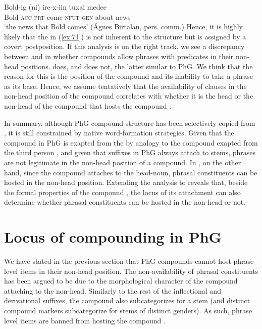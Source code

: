 \documentclass[output=paper]{LSP/langsci}
\begin{document}
\ea\label{ex:72}
	\gll  \lb{} Bold-ig (ni) ire-x\rb{}-iin tuxai medee\\
		{} Bold-\textsc{acc} \textsc{prt} come-\textsc{nfut-gen} about news\\
	\glt  `the news that Bold comes' \hfill (\'{A}gnes Birtalan, pers. comm.)
\z
Hence, it is highly likely that the  in (\ref{ex:71}) is not inherent to the structure but is assigned by a covert postposition. If this analysis is on the right track, we see a discrepancy between  and  in whether compounds allow phrases with predicates in their non-head positions.  does, and  does not, the latter similar to PhG. We think that the reason for this is the position of the compound  and its inability to take a phrase as its base. Hence, we assume tentatively that the availability of clauses in the non-head position of the compound correlates with whether it is the head or the non-head of the compound that hosts the compound . 

In summary, although PhG compound structure has been selectively copied from , it is still constrained by  native word-formation strategies. Given that the compound  in PhG is exapted from the   by analogy to the  compound  exapted from the third person  , and given that suffixes in PhG always attach to stems, phrases are not legitimate in the non-head position of a compound. In , on the other hand, since the compound  attaches to the head-noun, phrasal constituents can be hosted in the non-head position. Extending the  analysis to  reveals that, beside the formal properties of the compound , the locus of its attachment can also determine whether phrasal constituents can be hosted in the non-head or not.  
\section{Locus of compounding in PhG}
We have stated in the previous section that PhG compounds cannot host phrase-level items in their non-head position. The non-availability of phrasal con\-stit\-u\-ents has been argued to be due to the morphological character of the compound  attaching to the non-head. Similarly to the rest of the inflectional and derivational suffixes, the compound  also subcategorizes for a stem (and distinct compound markers subcategorize for stems of distinct genders). As such, phrase level items are banned from hosting the compound . 
\end{document}

